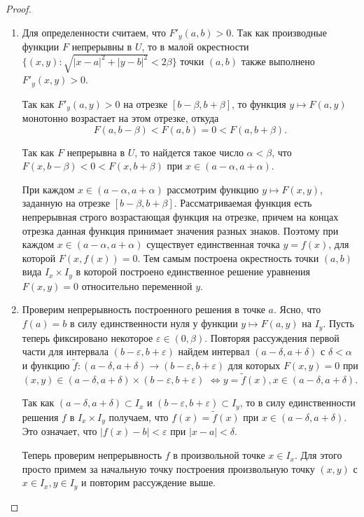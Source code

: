 \documentclass[a4paper]{article}
\theoremstyle{named}
\begin{document}
    \begin{proof}
        \begin{enumerate}
        \item
            Для определенности считаем, что $F'_y(a,b)>0$. Так как производные функции $F$ непрерывны в $U$, то в малой окрестности
            $\{(x,y)\colon \sqrt{|x-a|^2+|y-b|^2}<2\beta\}$ точки $(a,b)$ также выполнено $F'_y(x,y)>0$. 
            
            Так как $F'_y(a,y)>0$ на отрезке $[b-\beta, b+\beta]$, то функция $y\mapsto F(a,y)$
            монотонно возрастает на этом отрезке, откуда $$F(a, b-\beta)<F(a,b)=0<F(a,b+\beta).$$

            Так как $F$ непрерывна в $U$, то найдется такое число $\alpha<\beta$, что $F(x,b-\beta)<0<F(x,b+\beta)$ при $x\in(a-\alpha, a+\alpha)$.

            При каждом $x\in(a-\alpha, a+\alpha)$ рассмотрим функцию $y\mapsto F(x,y)$, заданную на отрезке $[b-\beta, b+\beta]$. Рассматриваемая функция есть непрерывная строго возрастающая функция на отрезке, причем на концах отрезка данная функция принимает значения разных знаков. Поэтому при каждом $x\in (a-\alpha, a+\alpha)$ существует единственная точка $y=f(x)$, для которой $F(x, f(x))=0$. Тем самым построена окрестность точки $(a,b)$ вида $I_x\times I_y$ в которой построено единственное решение уравнения $F(x,y)=0$ относительно переменной $y$.

        \item
            Проверим непрерывность построенного решения в точке $a$. Ясно, что $f(a)=b$ в силу единственности нуля у функции $y\mapsto F(a,y)$ на $I_y$. Пусть теперь фиксировано некоторое $\varepsilon\in(0,\beta)$. Повторяя рассуждения первой части для интервала $(b-\varepsilon, b+\varepsilon)$ найдем интервал $(a-\delta, a+\delta)$ с $\delta<\alpha$ и функцию $\tilde{f}\colon (a-\delta, a+\delta)\to(b-\varepsilon, b+\varepsilon)$ для которых $F(x,y)=0$ при $(x,y)\in (a-\delta, a+\delta)\times(b-\varepsilon, b+\varepsilon)$ $\Leftrightarrow y=\tilde{f}(x), x\in (a-\delta, a+\delta)$.

            Так как $(a-\delta, a+\delta)\subset I_x$ и $(b-\varepsilon, b+\varepsilon)\subset I_y$, то в силу единственности решения $f$ в $I_x\times I_y$ получаем, что $f(x)=\tilde{f}(x)$ при $x\in (a-\delta, a+\delta)$. Это означает, что $|f(x)-b|<\varepsilon$ при $|x-a|<\delta$.

            Теперь проверим непрерывность $f$ в произвольной точке $x\in I_x$. Для этого просто примем за начальную точку построения
            произвольную точку $(x,y)$ с $x\in I_x, y\in I_y$ и повторим рассуждение выше.


\end{enumerate}
\end{proof}
\end{document}
